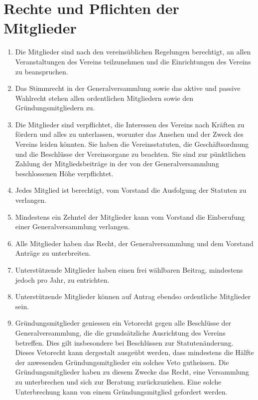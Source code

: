 \documentclass[a4paper,12pt]{article}
\begin{document}
	\section{Rechte und Pflichten der Mitglieder}
		\label{sec:rechte-pflichten}
		\begin{enumerate}
			\item Die Mitglieder sind nach den vereinsüblichen Regelungen berechtigt, an allen Veranstaltungen des Vereins teilzunehmen und die Einrichtungen des Vereins zu beanspruchen.
			\item Das Stimmrecht in der Generalversammlung sowie das aktive und passive Wahlrecht stehen allen ordentlichen Mitgliedern sowie den Gründungsmitgliedern zu.
			\item Die Mitglieder sind verpflichtet, die Interessen des Vereins nach Kräften zu fördern und alles zu unterlassen, worunter das Ansehen und der Zweck des Vereins leiden könnten. Sie haben die Vereinsstatuten, die Geschäftsordnung und die Beschlüsse der Vereinsorgane zu beachten. Sie sind zur pünktlichen Zahlung der Mitgliedsbeiträge in der von der Generalversammlung beschlossenen Höhe verpflichtet.
			\item Jedes Mitglied ist berechtigt, vom Vorstand die Ausfolgung der Statuten zu verlangen.
			\item Mindestens ein Zehntel der Mitglieder kann vom Vorstand die Einberufung einer Generalversammlung verlangen.
			\item Alle Mitglieder haben das Recht, der Generalversammlung und dem Vorstand Anträge zu unterbreiten.
			\item Unterstützende Mitglieder haben einen frei wählbaren Beitrag, mindestens jedoch  pro Jahr, zu entrichten.
			\item Unterstützende Mitglieder können auf Antrag ebendso ordentliche Mitglieder sein.
			\item Gründungsmitglieder geniessen ein Vetorecht gegen alle Beschlüsse der Generalversammlung, die die grundsätzliche Ausrichtung des Vereins betreffen. Dies gilt insbesondere bei Beschlüssen zur Statutenänderung. Dieses Vetorecht kann dergestalt ausgeübt werden, dass mindestens die Hälfte der anwesenden Gründungsmitglieder ein solches Veto gutheissen. Die Gründungsmitglieder haben zu diesem Zwecke das Recht, eine Versammlung zu unterbrechen und sich zur Beratung zurückzuziehen. Eine solche Unterbrechung kann von einem Gründungsmitglied gefordert werden.
		\end{enumerate}
\end{document}
